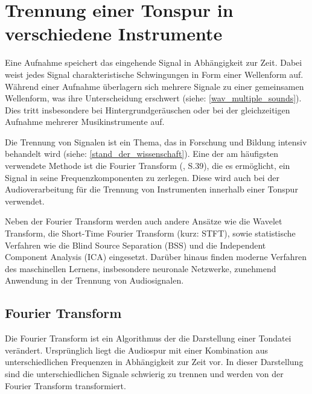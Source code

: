 \parencite{audioformate_im_überblick}

%
\section{Trennung einer Tonspur in verschiedene Instrumente}
%

Eine Aufnahme speichert das eingehende Signal in Abhängigkeit zur Zeit. Dabei weist jedes Signal charakteristische Schwingungen in Form einer Wellenform auf. Während einer Aufnahme überlagern sich mehrere Signale zu einer gemeinsamen Wellenform, was ihre Unterscheidung erschwert (siehe: \cref{wav_multiple_sounds}). Dies tritt insbesondere bei Hintergrundgeräuschen oder bei der gleichzeitigen Aufnahme mehrerer Musikinstrumente auf.

\par

Die Trennung von Signalen ist ein Thema, das in Forschung und Bildung intensiv behandelt wird (siehe: \cref{stand_der_wissenschaft}). Eine der am häufigsten verwendete Methode ist die Fourier Transform (\cite{fundamentals_of_music_processing}, S.39), die es ermöglicht, ein Signal in seine Frequenzkomponenten zu zerlegen. Diese wird auch bei der Audioverarbeitung für die Trennung von Instrumenten innerhalb einer Tonspur verwendet.

\par

Neben der Fourier Transform werden auch andere Ansätze wie die Wavelet Transform, die Short-Time Fourier Transform (kurz: STFT), sowie statistische Verfahren wie die Blind Source Separation (BSS) und die Independent Component Analysis (ICA) eingesetzt. Darüber hinaus finden moderne Verfahren des maschinellen Lernens, insbesondere neuronale Netzwerke, zunehmend Anwendung in der Trennung von Audiosignalen.

%
\subsection{Fourier Transform}
%

Die Fourier Transform ist ein Algorithmus der die Darstellung einer Tondatei verändert. Ursprünglich liegt die Audiospur mit einer Kombination aus unterschiedlichen Frequenzen in Abhängigkeit zur Zeit vor. In dieser Darstellung sind die unterschiedlichen Signale schwierig zu trennen und werden von der Fourier Transform transformiert.

\par

